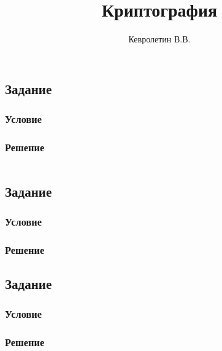 \documentclass[10pt,a4paper]{article}
\author{Кевролетин В.В.}
\title{Криптография}
\begin{document}
\maketitle

\subsection*{Задание}
\subsubsection*{Условие}
\subsubsection*{Решение}
\begin{lstlisting}
\end{lstlisting}


\subsection*{Задание}
\subsubsection*{Условие}
\subsubsection*{Решение}

\subsection*{Задание}
\subsubsection*{Условие}
\subsubsection*{Решение}
\end{document}
